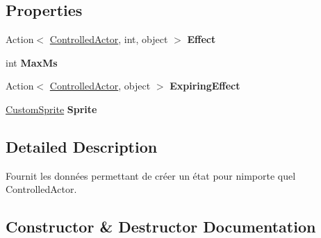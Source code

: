 \subsection*{Properties}
\begin{DoxyCompactItemize}
\item 
\mbox{\label{class_tentacle_slicers_1_1states_1_1_state_data_ada4c71814bbafb1392d1ab53d7adbe5d}} 
Action$<$ \hyperlink{class_tentacle_slicers_1_1actors_1_1_controlled_actor}{Controlled\+Actor}, int, object $>$ {\bfseries Effect}
\item 
\mbox{\label{class_tentacle_slicers_1_1states_1_1_state_data_ad655b012f949087ccd230faef70d5f44}} 
int {\bfseries Max\+Ms}
\item 
\mbox{\label{class_tentacle_slicers_1_1states_1_1_state_data_a1ca6e17f0a7127474d6ff09974a69992}} 
Action$<$ \hyperlink{class_tentacle_slicers_1_1actors_1_1_controlled_actor}{Controlled\+Actor}, object $>$ {\bfseries Expiring\+Effect}
\item 
\mbox{\label{class_tentacle_slicers_1_1states_1_1_state_data_a28f5231dc693c5b6454aaa7a126dfdfe}} 
\hyperlink{class_tentacle_slicers_1_1graphics_1_1_custom_sprite}{Custom\+Sprite} {\bfseries Sprite}
\end{DoxyCompactItemize}


\subsection{Detailed Description}
Fournit les données permettant de créer un état pour n\textquotesingle{}importe quel Controlled\+Actor. 



\subsection{Constructor \& Destructor Documentation}
\mbox{\label{class_tentacle_slicers_1_1states_1_1_state_data_a35bc4e89e0575e63e4f53f7134581f2f}} 
